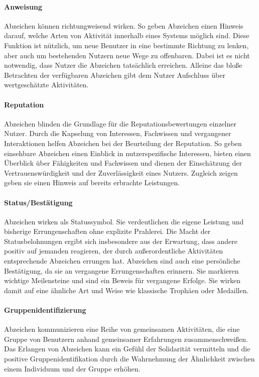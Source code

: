 \paragraph{Anweisung}
Abzeichen können richtungweisend wirken. So geben Abzeichen einen Hinweis darauf, welche Arten von Aktivität innerhalb eines Systems möglich sind. Diese Funktion ist nützlich, um neue Benutzer in eine bestimmte Richtung zu lenken, aber auch um bestehenden Nutzern neue Wege zu offenbaren. Dabei ist es nicht notwendig, dass Nutzer die Abzeichen tatsächlich erreichen. Alleine das bloße Betrachten der verfügbaren Abzeichen gibt dem Nutzer Aufschluss über wertgeschätzte Aktivitäten.

\paragraph{Reputation}
Abzeichen blinden die Grundlage für die Reputationsbewertungen einzelner Nutzer. Durch die Kapselung von Interessen, Fachwissen und vergangener Interaktionen helfen Abzeichen bei der Beurteilung der Reputation. So geben einsehbare Abzeichen einen Einblick in nutzerspezifische Interessen, bieten einen Überblick über Fähigkeiten und Fachwissen und dienen der Einschätzung der Vertrauenswürdigkeit und der Zuverlässigkeit eines Nutzers. Zugleich zeigen geben sie einen Hinweis auf bereits erbrachte Leistungen.

\paragraph{Status/Bestätigung}
Abzeichen wirken als Statussymbol. Sie verdeutlichen die eigene Leistung und bisherige Errungenschaften ohne explizite Prahlerei.
Die Macht der Statusbelohnungen ergibt sich insbesondere aus der Erwartung, dass andere positiv auf jemanden reagieren, der durch außerordentliche Aktivitäten entsprechende Abzeichen errungen hat. Abzeichen sind auch eine persönliche Bestätigung, da sie an vergangene Errungenschaften erinnern. Sie markieren wichtige Meilensteine und sind ein Beweis für vergangene Erfolge. Sie wirken damit auf eine ähnliche Art und Weise wie klassische Trophäen oder Medaillen.

\paragraph{Gruppenidentifizierung}
Abzeichen kommunizieren eine Reihe von gemeinsamen Aktivitäten, die eine Gruppe von Benutzern anhand gemeinsamer Erfahrungen zusammenschweißen. Das Erlangen von Abzeichen kann ein Gefühl der Solidarität vermitteln und die positive Gruppenidentifikation durch die Wahrnehmung der Ähnlichkeit zwischen einem Individuum und der Gruppe erhöhen.\\

